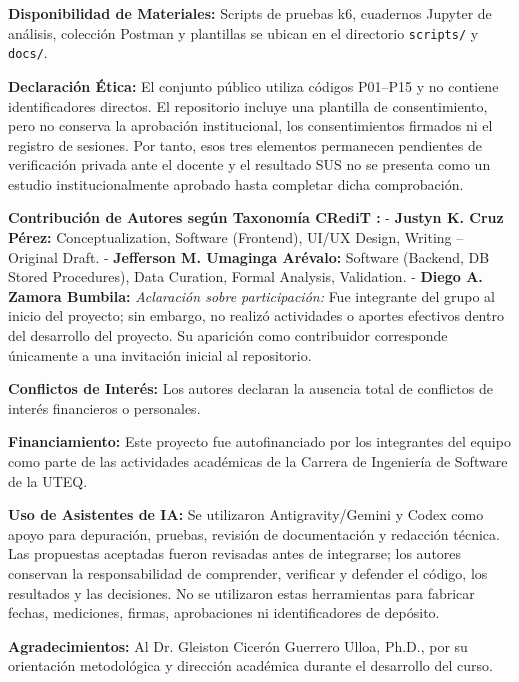 \documentclass[11pt,a4paper]{report}
\begin{document}
\textbf{Disponibilidad de Materiales:} Scripts de pruebas k6, cuadernos Jupyter de análisis, colección Postman y plantillas se ubican en el directorio \texttt{scripts/} y \texttt{docs/}.

\textbf{Declaración Ética:} El conjunto público utiliza códigos P01--P15 y no contiene identificadores directos. El repositorio incluye una plantilla de consentimiento, pero no conserva la aprobación institucional, los consentimientos firmados ni el registro de sesiones. Por tanto, esos tres elementos permanecen pendientes de verificación privada ante el docente y el resultado SUS no se presenta como un estudio institucionalmente aprobado hasta completar dicha comprobación.

\textbf{Contribución de Autores según Taxonomía CRediT \cite{niso2022credit}:}
- \textbf{Justyn K. Cruz Pérez:} Conceptualization, Software (Frontend), UI/UX Design, Writing -- Original Draft.
- \textbf{Jefferson M. Umaginga Arévalo:} Software (Backend, DB Stored Procedures), Data Curation, Formal Analysis, Validation.
- \textbf{Diego A. Zamora Bumbila:} \textit{Aclaración sobre participación:} Fue integrante del grupo al inicio del proyecto; sin embargo, no realizó actividades o aportes efectivos dentro del desarrollo del proyecto. Su aparición como contribuidor corresponde únicamente a una invitación inicial al repositorio.

\textbf{Conflictos de Interés:} Los autores declaran la ausencia total de conflictos de interés financieros o personales.

\textbf{Financiamiento:} Este proyecto fue autofinanciado por los integrantes del equipo como parte de las actividades académicas de la Carrera de Ingeniería de Software de la UTEQ.

\textbf{Uso de Asistentes de IA:} Se utilizaron Antigravity/Gemini y Codex como apoyo para depuración, pruebas, revisión de documentación y redacción técnica. Las propuestas aceptadas fueron revisadas antes de integrarse; los autores conservan la responsabilidad de comprender, verificar y defender el código, los resultados y las decisiones. No se utilizaron estas herramientas para fabricar fechas, mediciones, firmas, aprobaciones ni identificadores de depósito.

\textbf{Agradecimientos:} Al Dr. Gleiston Cicerón Guerrero Ulloa, Ph.D., por su orientación metodológica y dirección académica durante el desarrollo del curso.



\end{document}
